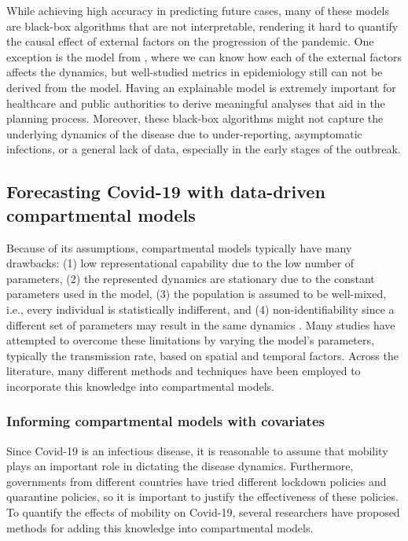 While achieving high accuracy in predicting future cases, many of these models are black-box algorithms that are not interpretable, rendering it hard to quantify the causal effect of external factors on the progression of the pandemic.
One exception is the model from \cite{ramchandaniDeepCOVIDNetInterpretableDeep2020}, where we can know how each of the external factors affects the dynamics, but well-studied metrics in epidemiology still can not be derived from the model.
Having an explainable model is extremely important for healthcare and public authorities to derive meaningful analyses that aid in the planning process.
Moreover, these black-box algorithms might not capture the underlying dynamics of the disease due to under-reporting, asymptomatic infections, or a general lack of data, especially in the early stages of the outbreak.

\subsection{Forecasting Covid-19 with data-driven compartmental models}

Because of its assumptions, compartmental models typically have many drawbacks: (1) low representational capability due to the low number of parameters, (2) the represented dynamics are stationary due to the constant parameters used in the model, (3) the population is assumed to be well-mixed, i.e., every individual is statistically indifferent, and (4) non-identifiability since a different set of parameters may result in the same dynamics \cite{roosaAssessingParameterIdentifiability2019}.
Many studies have attempted to overcome these limitations by varying the model's parameters, typically the transmission rate, based on spatial and temporal factors.
Across the literature, many different methods and techniques have been employed to incorporate this knowledge into compartmental models.

\subsubsection{Informing compartmental models with covariates}

Since Covid-19 is an infectious disease, it is reasonable to assume that mobility plays an important role in dictating the disease dynamics.
Furthermore, governments from different countries have tried different lockdown policies and quarantine policies, so it is important to justify the effectiveness of these policies.
To quantify the effects of mobility on Covid-19, several researchers have proposed methods for adding this knowledge into compartmental models.

